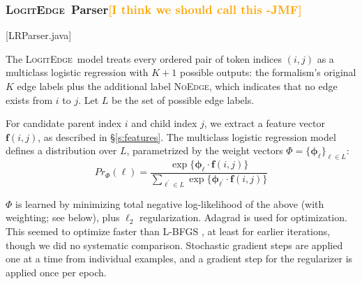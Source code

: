 \documentclass[11pt]{article}
\newcommand{\jmf}[1]{\textcolor{orange}{[#1 -JMF]}}
\newcommand{\codenote}[1]{\textcolor{PineGreen}{[#1]}}
\newcommand{\logitedge}{\textsc{LogitEdge}}
\newcommand{\noedge}{\textsc{NoEdge}}
\begin{document}
\subsubsection{\logitedge\ Parser\jmf{I think we should call this
}}
\label{s:logitedge}


\codenote{LRParser.java}

The \logitedge\ model treats every ordered pair of token indices $(i, j)$ as a
multiclass logistic regression with $K+1$ possible outputs:
the formalism's original $K$ edge labels plus the additional label \noedge,
which indicates that no edge exists from $i$ to $j$.
Let $L$ be the set of possible edge labels.

% 
For candidate parent index $i$ and child index $j$, we extract a feature vector
$\bm{f}(i, j)$, as described in \S\ref{s:features}.
The multiclass logistic regression model defines a distribution over $L$,
parametrized by the weight vectors $\Phi = \{\bm\phi_\ell\}_{\ell \in L}$:
\[
  Pr_\Phi(\ell)  = \frac{
  	\exp\{\bm\phi_\ell \cdot \bm{f}(i, j)\}
  } {
  	\sum_{\ell^\prime \in L} {
  		\exp\{\bm\phi_{\ell^\prime} \cdot \bm{f}(i, j)\}
  	}
  }
\]

\noindent
$\Phi$ is learned by minimizing total negative log-likelihood of the above
(with weighting; see below), plus $\ell_2$ regularization.
Adagrad \cite{duchi_adaptive_2011} is used for optimization.
This seemed to optimize faster than L-BFGS \cite{byrd_limited_1995}, at least for earlier
iterations, though we did no systematic comparison. Stochastic gradient steps are applied one at a time from individual examples, and a gradient step for the regularizer is applied once per epoch.
\end{document}
